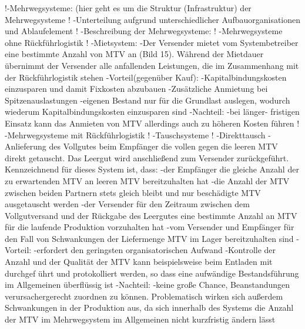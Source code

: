 !-Mehrwegsysteme: (hier geht es um die Struktur (Infrastruktur) der Mehrwegsysteme
!    -Unterteilung aufgrund unterschiedlicher Aufbauorganisationen und Ablaufelement
!        -Beschreibung der Mehrwegsysteme:
!            -Mehrwegsysteme ohne Rückführlogistik
!                -Mietsystem:
                    -Der Versender mietet vom Systembetreiber eine bestimmte Anzahl von MTV an (Bild 15). Während der Mietdauer übernimmt der Versender alle anfallenden Leistungen, die im Zusammenhang mit der Rückführlogistik stehen
                        -Vorteil(gegenüber Kauf):
                            -Kapitalbindungskosten einzusparen und damit Fixkosten abzubauen
                            -Zusätzliche Anmietung bei Spitzenauslastungen
                                -eigenen Bestand nur für die Grundlast auslegen, wodurch wiederum Kapitalbindungskosten einzusparen sind
                        -Nachteil:
                            -bei länger- fristigen Einsatz kann das Anmieten von MTV allerdings auch zu höheren Kosten führen
!            -Mehrwegsysteme mit Rückführlogistik
!                -Tauschsysteme
!                    -Direkttausch
                        -Anlieferung des Vollgutes beim Empfänger die vollen gegen die leeren MTV direkt getauscht. Das Leergut wird anschließend zum Versender zurückgeführt. Kennzeichnend für dieses System ist, dass:
                            -der Empfänger die gleiche Anzahl der zu erwartenden MTV an leeren MTV bereitzuhalten hat
                            -die Anzahl der MTV zwischen beiden Partnern stets gleich bleibt und nur beschädigte MTV ausgetauscht werden 
                            -der Versender für den Zeitraum zwischen dem Vollgutversand und der Rückgabe des Leergutes eine bestimmte Anzahl an MTV für die laufende Produktion vorzuhalten hat
                            -vom Versender und Empfänger für den Fall von Schwankungen der Liefermenge MTV im Lager bereitzuhalten sind
                        -Vorteil:
                            -erfordert den geringsten organisatorischen Aufwand
                            -Kontrolle der Anzahl und der Qualität der MTV kann beispielsweise beim Entladen mit durchgef ührt und protokolliert werden, so dass eine aufwändige Bestandsführung im Allgemeinen überflüssig ist
                        -Nachteil:
                            -keine große Chance, Beanstandungen verursachergerecht zuordnen zu können. Problematisch wirken sich außerdem Schwankungen in der Produktion aus, da sich innerhalb des Systems die Anzahl der MTV im Mehrwegsystem im Allgemeinen nicht kurzfristig ändern lässt
